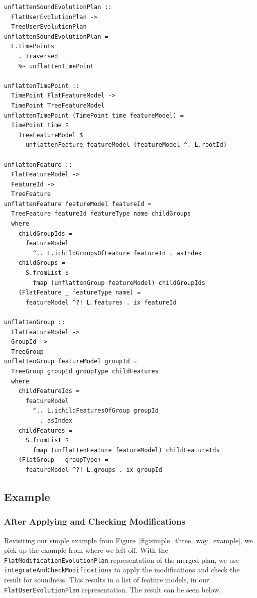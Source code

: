 \documentclass[a4paper,english]{ifimaster}
\begin{document}
\begin{verbatim}
unflattenSoundEvolutionPlan ::
  FlatUserEvolutionPlan ->
  TreeUserEvolutionPlan
unflattenSoundEvolutionPlan =
  L.timePoints
    . traversed
    %~ unflattenTimePoint

unflattenTimePoint ::
  TimePoint FlatFeatureModel ->
  TimePoint TreeFeatureModel
unflattenTimePoint (TimePoint time featureModel) =
  TimePoint time $
    TreeFeatureModel $
      unflattenFeature featureModel (featureModel ^. L.rootId)

unflattenFeature ::
  FlatFeatureModel ->
  FeatureId ->
  TreeFeature
unflattenFeature featureModel featureId =
  TreeFeature featureId featureType name childGroups
  where
    childGroupIds =
      featureModel
        ^.. L.ichildGroupsOfFeature featureId . asIndex
    childGroups =
      S.fromList $
        fmap (unflattenGroup featureModel) childGroupIds
    (FlatFeature _ featureType name) =
      featureModel ^?! L.features . ix featureId

unflattenGroup ::
  FlatFeatureModel ->
  GroupId ->
  TreeGroup
unflattenGroup featureModel groupId =
  TreeGroup groupId groupType childFeatures
  where
    childFeatureIds =
      featureModel
        ^.. L.ichildFeaturesOfGroup groupId
          . asIndex
    childFeatures =
      S.fromList $
        fmap (unflattenFeature featureModel) childFeatureIds
    (FlatGroup _ groupType) =
      featureModel ^?! L.groups . ix groupId
\end{verbatim}

\subsection{Example}%
\label{sub:example}

\subsubsection{After Applying and Checking Modifications}%
\label{ssub:after_applying_and_checking_modifications}

Revisiting our simple example from Figure~\vref{fig:simple_three_way_example}, we pick up the example from where we left off. With the \texttt{FlatModificationEvolutionPlan} representation of the merged plan, we use \texttt{integrateAndCheckModifications} to apply the modifications and check the result for soundness. This results in a list of feature models, in our \texttt{FlatUserEvolutionPlan} representation. The result can be seen below.
\end{document}
